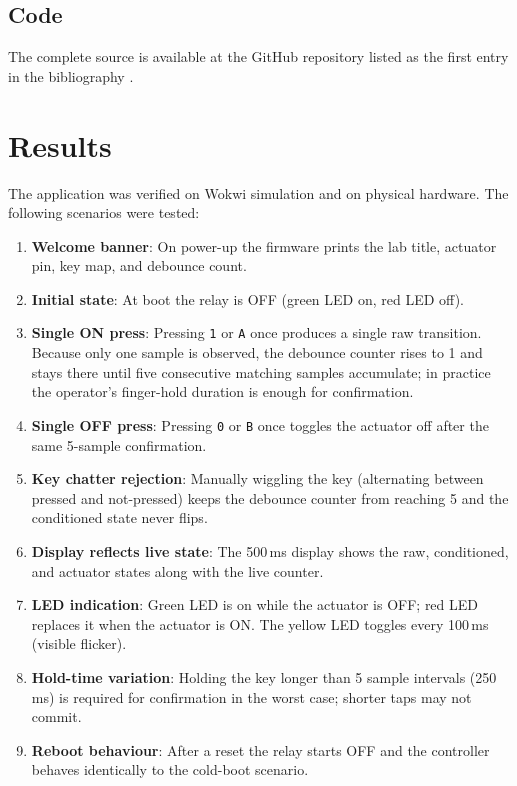 \documentclass[12pt]{article}
\begin{document}
\subsection{Code}

The complete source is available at the GitHub repository listed as the first entry in the bibliography \cite{code}.

\section{Results}\label{sec:results}

The application was verified on Wokwi simulation and on physical hardware. The following scenarios were tested:
\begin{enumerate}
  \item \textbf{Welcome banner}: On power-up the firmware prints the lab title, actuator pin, key map, and debounce count.
  \item \textbf{Initial state}: At boot the relay is OFF (green LED on, red LED off).
  \item \textbf{Single ON press}: Pressing \texttt{1} or \texttt{A} once produces a single raw transition. Because only one sample is observed, the debounce counter rises to 1 and stays there until five consecutive matching samples accumulate; in practice the operator's finger-hold duration is enough for confirmation.
  \item \textbf{Single OFF press}: Pressing \texttt{0} or \texttt{B} once toggles the actuator off after the same 5-sample confirmation.
  \item \textbf{Key chatter rejection}: Manually wiggling the key (alternating between pressed and not-pressed) keeps the debounce counter from reaching 5 and the conditioned state never flips.
  \item \textbf{Display reflects live state}: The 500\,ms display shows the raw, conditioned, and actuator states along with the live counter.
  \item \textbf{LED indication}: Green LED is on while the actuator is OFF; red LED replaces it when the actuator is ON. The yellow LED toggles every 100\,ms (visible flicker).
  \item \textbf{Hold-time variation}: Holding the key longer than 5 sample intervals (250\,ms) is required for confirmation in the worst case; shorter taps may not commit.
  \item \textbf{Reboot behaviour}: After a reset the relay starts OFF and the controller behaves identically to the cold-boot scenario.
\end{enumerate}
\end{document}
